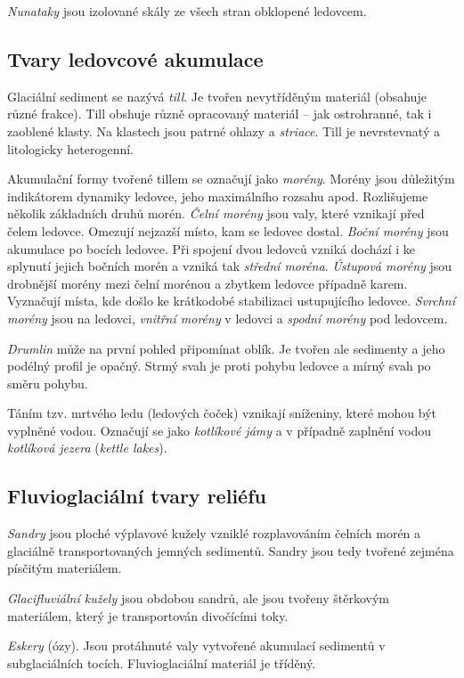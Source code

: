 \emph{Nunataky} jsou izolované skály ze všech stran obklopené ledovcem.

\subsection{Tvary ledovcové akumulace}
Glaciální sediment se nazývá \emph{till}. Je tvořen nevytříděným materiál (obsahuje různé frakce). Till obshuje různě opracovaný materiál -- jak ostrohranné, tak i zaoblené klasty. Na klastech jsou patrné ohlazy a \emph{striace}. Till je nevrstevnatý a litologicky heterogenní.

Akumulační formy tvořené tillem se označují jako \emph{morény}. Morény jsou důležitým indikátorem dynamiky ledovce, jeho maximálního rozsahu apod. Rozlišujeme několik základních druhů morén. \emph{Čelní morény} jsou valy, které vznikají před čelem ledovce. Omezují nejzazší místo, kam se ledovec dostal. \emph{Boční morény} jsou akumulace po bocích ledovce. Při spojení dvou ledovců vzniká dochází i ke splynutí jejich bočních morén a vzniká tak \emph{střední moréna}. \emph{Ústupová morény} jsou drobnější morény mezi čelní morénou a zbytkem ledovce případně karem. Vyznačují místa, kde došlo ke krátkodobé stabilizaci ustupujícího ledovce. \emph{Svrchní morény} jsou na ledovci, \emph{vnitřní morény} v ledovci a \emph{spodní morény} pod ledovcem.

\emph{Drumlin} může na první pohled připomínat oblík. Je tvořen ale sedimenty a jeho podélný profil je opačný. Strmý svah je proti pohybu ledovce a mírný svah po směru pohybu. 

Táním tzv. mrtvého ledu (ledových čoček) vznikají sníženiny, které mohou být vyplněné vodou. Označují se jako \emph{kotlíkové jámy} a v případně zaplnění vodou \emph{kotlíková jezera} (\textit{kettle lakes}).

\subsection{Fluvioglaciální tvary reliéfu}
\emph{Sandry} jsou ploché výplavové kužely vzniklé rozplavováním čelních morén a glaciálně transportovaných jemných sedimentů. Sandry jsou tedy tvořené zejména písčitým materiálem. 

\emph{Glacifluviální kužely} jsou obdobou sandrů, ale jsou tvořeny štěrkovým materiálem, který je transportován divočícími toky.

\emph{Eskery} (ózy). Jsou protáhnuté valy vytvořené akumulací sedimentů v subglaciálních tocích. Fluvioglaciální materiál je tříděný.

